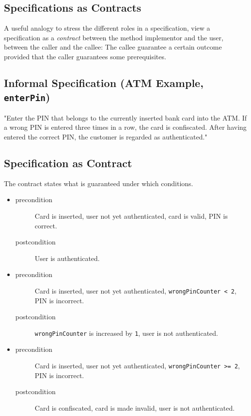 \documentclass[a4paper, 11pt, accentcolor = tud3b]{tudreport}
\begin{document}
			\subsection{Specifications as Contracts}
				A useful analogy to stress the different roles in a specification, view a specification as a \textit{contract} between the method implementor and the user, between the caller and the callee: The callee guarantee a certain outcome provided that the caller guarantees some prerequisites.

			\subsection{Informal Specification (ATM Example, \texttt{enterPin})}
				"Enter the PIN that belongs to the currently inserted bank card into the ATM. If a wrong PIN is entered three times in a row, the card is confiscated. After having entered the correct PIN, the customer is regarded as authenticated."

			\subsection{Specification as Contract}
				The contract states what is guaranteed under which conditions.
				\begin{itemize}
					\item[]
						\begin{description}
							\item[precondition] Card is inserted, user not yet authenticated, card is valid, PIN is correct.
							\item[postcondition] User is authenticated.
						\end{description}
					\item[]
						\begin{description}
							\item[precondition] Card is inserted, user not yet authenticated, \texttt{wrongPinCounter < 2}, PIN is incorrect.
							\item[postcondition] \texttt{wrongPinCounter} is increased by \texttt{1}, user is not authenticated.
						\end{description}
					\item[]
						\begin{description}
							\item[precondition] Card is inserted, user not yet authenticated, \texttt{wrongPinCounter >= 2}, PIN is incorrect.
							\item[postcondition] Card is confiscated, card is made invalid, user is not authenticated.
						\end{description}
				\end{itemize}
			
\end{document}
